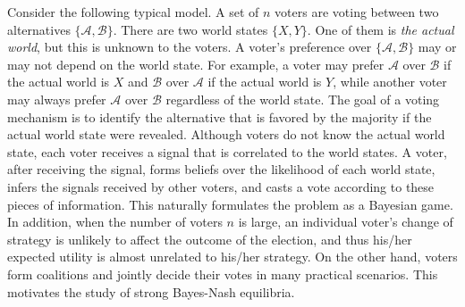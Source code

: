 Consider the following typical model.
A set of $n$ voters are voting between two alternatives $\{\mathcal{A},\mathcal{B}\}$.
There are two world states $\{X,Y\}$.
One of them is \emph{the actual world}, but this is unknown to the voters.
A voter's preference over $\{\mathcal{A},\mathcal{B}\}$ may or may not depend on the world state.
For example, a voter may prefer $\mathcal{A}$ over $\mathcal{B}$ if the actual world is $X$ and $\mathcal{B}$ over $\mathcal{A}$ if the actual world is $Y$, while another voter may always prefer $\mathcal{A}$ over $\mathcal{B}$ regardless of the world state.
The goal of a voting mechanism is to identify the alternative that is favored by the majority if the actual world state were revealed.
Although voters do not know the actual world state, each voter receives a signal that is correlated to the world states.
A voter, after receiving the signal, forms beliefs over the likelihood of each world state, infers the signals received by other voters, and casts a vote according to these pieces of information.
This naturally formulates the problem as a Bayesian game.
In addition, when the number of voters $n$ is large, an individual voter's change of strategy is unlikely to affect the outcome of the election, and thus his/her expected utility is almost unrelated to his/her strategy.
On the other hand, voters form coalitions and jointly decide their votes in many practical scenarios.
This motivates the study of strong Bayes-Nash equilibria.


